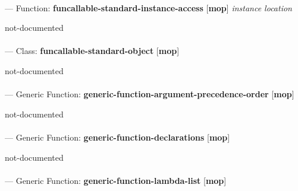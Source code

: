 \paragraph{}
\label{MOP:FUNCALLABLE-STANDARD-INSTANCE-ACCESS}
--- Function: \textbf{funcallable-standard-instance-access} [\textbf{mop}] \textit{instance location}

\begin{adjustwidth}{5em}{5em}
not-documented
\end{adjustwidth}

\paragraph{}
\label{MOP:FUNCALLABLE-STANDARD-OBJECT}
--- Class: \textbf{funcallable-standard-object} [\textbf{mop}] \textit{}

\begin{adjustwidth}{5em}{5em}
not-documented
\end{adjustwidth}

\paragraph{}
\label{MOP:GENERIC-FUNCTION-ARGUMENT-PRECEDENCE-ORDER}
--- Generic Function: \textbf{generic-function-argument-precedence-order} [\textbf{mop}] \textit{}

\begin{adjustwidth}{5em}{5em}
not-documented
\end{adjustwidth}

\paragraph{}
\label{MOP:GENERIC-FUNCTION-DECLARATIONS}
--- Generic Function: \textbf{generic-function-declarations} [\textbf{mop}] \textit{}

\begin{adjustwidth}{5em}{5em}
not-documented
\end{adjustwidth}

\paragraph{}
\label{MOP:GENERIC-FUNCTION-LAMBDA-LIST}
--- Generic Function: \textbf{generic-function-lambda-list} [\textbf{mop}] \textit{}


